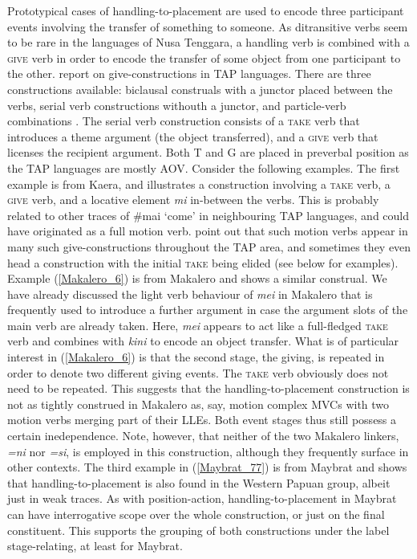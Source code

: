 Prototypical cases of handling-to-placement are used to encode three participant events involving the transfer of something to someone. As ditransitive verbs seem to be rare in the languages of Nusa Tenggara, a handling verb is combined with a \textsc{give} verb in order to encode the transfer of some object from one participant to the other. \citet{klamer2012development} report on give-constructions in TAP languages. There are three constructions available: biclausal construals with a junctor placed between the verbs, serial verb constructions withouth a junctor, and particle-verb combinations \citep{klamer2012development}. The serial verb construction consists of a \textsc{take} verb that introduces a theme argument (the object transferred), and a \textsc{give} verb that licenses the recipient argument. Both T and G are placed in preverbal position as the TAP languages are mostly AOV. Consider the following examples. The first example is from Kaera, and illustrates a construction involving a \textsc{take} verb, a \textsc{give} verb, and a locative element \textit{mi} in-between the verbs. This is probably related to other traces of \#mai `come' in neighbouring TAP languages, and could have originated as a full motion verb. \citet{klamer2012development} point out that such motion verbs appear in many such give-constructions throughout the TAP area, and sometimes they even head a construction with the initial \textsc{take} being elided (see below for examples). Example (\ref{Makalero_6}) is from Makalero and shows a similar construal. We have already discussed the light verb behaviour of \textit{mei} in Makalero that is frequently used to introduce a further argument in case the argument slots of the main verb are already taken. Here, \textit{mei} appears to act like a full-fledged \textsc{take} verb and combines with \textit{kini} to encode an object transfer. What is of particular interest in (\ref{Makalero_6}) is that the second stage, the giving, is repeated in order to denote two different giving events. The \textsc{take} verb obviously does not need to be repeated. This suggests that the handling-to-placement construction is not as tightly construed in Makalero as, say, motion complex MVCs with two motion verbs merging part of their LLEs. Both event stages thus still possess a certain inedependence. Note, however, that neither of the two Makalero linkers, \textit{=ni} nor \textit{=si}, is employed in this construction, although they frequently surface in other contexts. The third example in (\ref{Maybrat_77}) is from Maybrat and shows that handling-to-placement is also found in the Western Papuan group, albeit just in weak traces. As with position-action, handling-to-placement in Maybrat can have interrogative scope over the whole construction, or just on the final constituent. This supports the grouping of both constructions under the label stage-relating, at least for Maybrat. 

